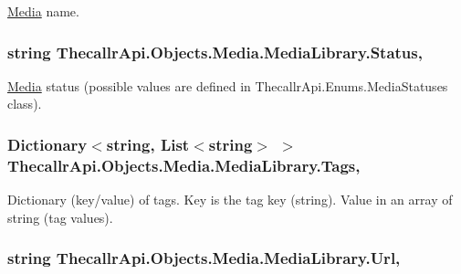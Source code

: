 \hyperlink{namespace_thecallr_api_1_1_objects_1_1_media}{Media} name. 

\hypertarget{class_thecallr_api_1_1_objects_1_1_media_1_1_media_library_a241facca8ba1a21a3c3b6cf0ad116334}{
\subsubsection[{Status}]{\setlength{\rightskip}{0pt plus 5cm}string Thecallr\+Api.\+Objects.\+Media.\+Media\+Library.\+Status\hspace{0.3cm}{\ttfamily [get]}, {\ttfamily [set]}}}\label{class_thecallr_api_1_1_objects_1_1_media_1_1_media_library_a241facca8ba1a21a3c3b6cf0ad116334}


\hyperlink{namespace_thecallr_api_1_1_objects_1_1_media}{Media} status (possible values are defined in Thecallr\+Api.\+Enums.\+Media\+Statuses class). 

\hypertarget{class_thecallr_api_1_1_objects_1_1_media_1_1_media_library_a762c427c7906705923eb7d5ee5b6feb5}{
\subsubsection[{Tags}]{\setlength{\rightskip}{0pt plus 5cm}Dictionary$<$string, List$<$string$>$ $>$ Thecallr\+Api.\+Objects.\+Media.\+Media\+Library.\+Tags\hspace{0.3cm}{\ttfamily [get]}, {\ttfamily [set]}}}\label{class_thecallr_api_1_1_objects_1_1_media_1_1_media_library_a762c427c7906705923eb7d5ee5b6feb5}


Dictionary (key/value) of tags. Key is the tag key (string). Value in an array of string (tag values). 

\hypertarget{class_thecallr_api_1_1_objects_1_1_media_1_1_media_library_afe79591d315a5a0b69c908d176491b62}{
\subsubsection[{Url}]{\setlength{\rightskip}{0pt plus 5cm}string Thecallr\+Api.\+Objects.\+Media.\+Media\+Library.\+Url\hspace{0.3cm}{\ttfamily [get]}, {\ttfamily [set]}}}\label{class_thecallr_api_1_1_objects_1_1_media_1_1_media_library_afe79591d315a5a0b69c908d176491b62}


